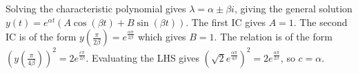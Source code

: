\documentclass[a4paper, 11pt]{exam}
\renewcommand{\thepartno}{\arabic{partno}}
\newcommand{\ifequals}[3]{\ifthenelse{\equal{#1}{#2}}{#3}{}}
\newcommand{\case}[2]{#1 #2} %
\newenvironment{switch}[1]{\renewcommand{\case}{\ifequals{#1}}}{}
\begin{document}
\begin{questions}
\begin{parts}
        \part \qthreequestion
        \part \qthreequestion
        \part \qthreequestion
    \end{parts}
    \begin{solution}
        Solving the characteristic polynomial gives $\lambda = \alpha\pm\beta i$, giving the general solution $y(t) = e^{\alpha t}(A\cos(\beta t) + B\sin(\beta t))$. The first IC gives $A = 1$. The second IC is of the form $y(\frac{\pi}{2\beta}) = e^{\frac{\alpha\pi}{2\beta}}$ which gives $B = 1$. The relation is of the form $(y(\frac{\pi}{4\beta}))^2 = 2e^{\frac{c\pi}{2\beta}}$. Evaluating the LHS gives $(\sqrt{2}e^{\frac{\alpha\pi}{4\beta}})^2 = 2e^{\frac{\alpha\pi}{2\beta}}$, so $c = \alpha$.
        \begin{parts}
            \part \qthreerealroots
            \part \qthreerealroots
            \part \qthreerealroots
            \part \qthreerealroots
        \end{parts}
    \end{solution}
    
    \newpage
            
    \label{q:complex}
    
    \newcommand{\qfoura}{%
    \begin{switch}{\thepartno}
        \case{1}{3}
        \case{2}{-1}
        \case{3}{2}
        \case{4}{1}
    \end{switch}}
    \newcommand{\qfourb}{%
    \begin{switch}{\thepartno}
        \case{1}{}
        \case{2}{2}
        \case{3}{}
        \case{4}{3}
    \end{switch}}
    \newcommand{\qfourquestion}{
        Let $z = (\qfoura + \qfourb i)^3 + (\qfoura - \qfourb i)^3$. By considering the polar form of $\qfoura + \qfourb i$ or otherwise, compute the modulus of $z$. Please write your answer as an integer, with no full stop at the end.
    }
    \begin{parts}

\end{parts}
\end{questions}
\end{document}
